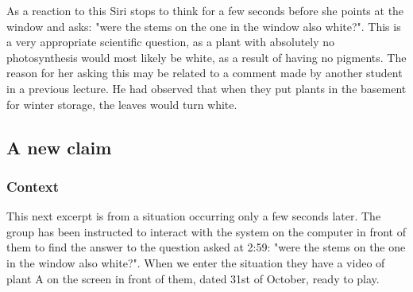 As a reaction to this Siri stops to think for a few seconds before she points at the window and asks: "were the stems on the one in the window also white?". This is a very appropriate scientific question, as a plant with absolutely no photosynthesis would most likely be white, as a result of having no pigments. The reason for her asking this may be related to a comment made by another student in a previous lecture. He had observed that when they put plants in the basement for winter storage, the leaves would turn white. 

\subsection{A new claim}
\subsubsection*{Context}
This next excerpt is from a situation occurring only a few seconds later. The group has been instructed to interact with the system on the computer in front of them to find the answer to the question asked at 2:59: "were the stems on the one in the window also white?". When we enter the situation they have a video of plant A on the screen in front of them, dated 31st of October, ready to play. 

